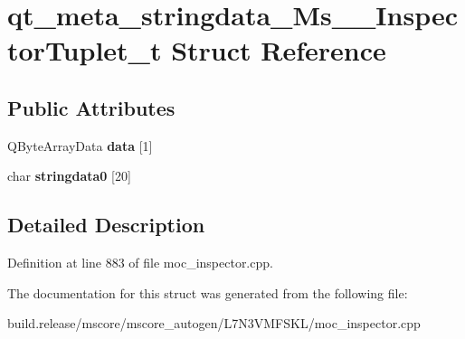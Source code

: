 \hypertarget{structqt__meta__stringdata___ms_____inspector_tuplet__t}{}\section{qt\+\_\+meta\+\_\+stringdata\+\_\+\+Ms\+\_\+\+\_\+\+Inspector\+Tuplet\+\_\+t Struct Reference}
\label{structqt__meta__stringdata___ms_____inspector_tuplet__t}
\subsection*{Public Attributes}
\begin{DoxyCompactItemize}
\item 
\mbox{\label{structqt__meta__stringdata___ms_____inspector_tuplet__t_a8604420bdb14b895ad1f857fe7225bd3}} 
Q\+Byte\+Array\+Data {\bfseries data} \mbox{[}1\mbox{]}
\item 
\mbox{\label{structqt__meta__stringdata___ms_____inspector_tuplet__t_ae265a4dc371b0ae377713c17b5f0a0d6}} 
char {\bfseries stringdata0} \mbox{[}20\mbox{]}
\end{DoxyCompactItemize}


\subsection{Detailed Description}


Definition at line 883 of file moc\+\_\+inspector.\+cpp.



The documentation for this struct was generated from the following file\+:\begin{DoxyCompactItemize}
\item 
build.\+release/mscore/mscore\+\_\+autogen/\+L7\+N3\+V\+M\+F\+S\+K\+L/moc\+\_\+inspector.\+cpp\end{DoxyCompactItemize}

